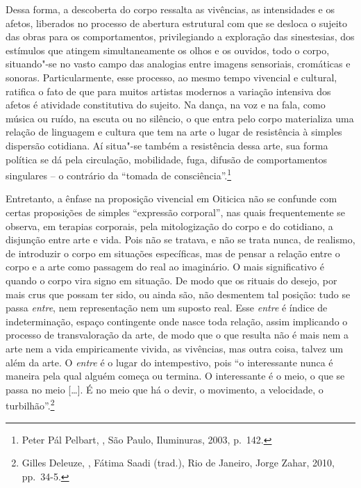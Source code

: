 Dessa forma, a descoberta do corpo ressalta as vivências, as
intensidades e os afetos, liberados no processo de abertura estrutural
com que se desloca o sujeito das obras para os comportamentos,
privilegiando a exploração das sinestesias, dos estímulos que atingem
simultaneamente os olhos e os ouvidos, todo o corpo, situando"-se no
vasto campo das analogias entre imagens sensoriais, cromáticas e
sonoras. Particularmente, esse processo, ao mesmo tempo vivencial e
cultural, ratifica o fato de que para muitos artistas modernos a
variação intensiva dos afetos é atividade constitutiva do sujeito. Na
dança, na voz e na fala, como música ou ruído, na escuta ou no silêncio,
o que entra pelo corpo materializa uma relação de linguagem e cultura
que tem na arte o lugar de resistência à simples dispersão cotidiana. Aí
situa"-se também a resistência dessa arte, sua forma política se dá pela
circulação, mobilidade, fuga, difusão de comportamentos singulares -- o
contrário da ``tomada de consciência''.\footnote{Peter Pál Pelbart, {}, São Paulo, Iluminuras, 2003, p.~142.}

Entretanto, a ênfase na proposição vivencial em Oiticica não se confunde
com certas proposições de simples ``expressão corporal'', nas quais
frequentemente se observa, em terapias corporais, pela mitologização do
corpo e do cotidiano, a disjunção entre arte e vida. Pois não se
tratava, e não se trata nunca, de realismo, de introduzir o corpo em
situações específicas, mas de pensar a relação entre o corpo e a arte
como passagem do real ao imaginário. O mais significativo é quando o
corpo vira signo em situação. De modo que os rituais do desejo, por mais
crus que possam ter sido, ou ainda são, não desmentem tal posição: tudo
se passa \emph{entre}, nem representação nem um suposto real.
Esse \emph{entre} é índice de indeterminação, espaço contingente onde
nasce toda relação, assim implicando o processo de transvaloração da
arte, de modo que o que resulta não é mais nem a arte nem a vida
empiricamente vivida, as vivências, mas outra coisa, talvez um além da
arte. O \emph{entre} é o lugar do intempestivo, pois ``o interessante
nunca é maneira pela qual alguém começa ou termina. O interessante é o
meio, o que se passa no meio {[}\ldots{}{]}. É no meio que há o devir, o
movimento, a velocidade, o turbilhão''.\footnote{Gilles Deleuze, {}, Fátima Saadi (trad.), Rio de Janeiro,
  Jorge Zahar, 2010, pp.~34-5.}

\asterisc

